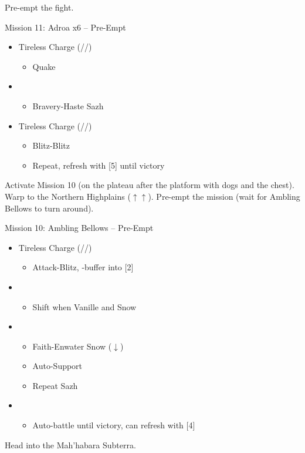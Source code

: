 \renewcommand{\third}{[3] Hero's Charge (\syn/\med/\com)}
\renewcommand{\fourth}{[4] Tireless Charge (\com/\med/\com)}

Pre-empt the fight.

\begin{battle}{Mission 11: Adroa x6 -- Pre-Empt}
	\begin{itemize}
		\item \fourth
			\begin{itemize}
				\item Quake
			\end{itemize}
		\item \first
			\begin{itemize}
				\item Bravery-Haste Sazh
			\end{itemize}
		\item \fourth
			\begin{itemize}
				\item Blitz-Blitz
				\item Repeat, refresh with [5] until victory
			\end{itemize}
	\end{itemize}
\end{battle}

Activate Mission 10 (on the plateau after the platform with dogs and the chest).
Warp to the Northern Highplains ($\uparrow\uparrow$).
Pre-empt the mission (wait for Ambling Bellows to turn around).

\begin{battle}{Mission 10: Ambling Bellows -- Pre-Empt}
	\begin{itemize}
		\item \fourth
			\begin{itemize}
				\item Attack-Blitz, \rav-buffer into [2]
			\end{itemize}
		\item \second
			\begin{itemize}
				\item Shift when Vanille and Snow \stagger
			\end{itemize}
		\item \first
			\begin{itemize}
				\item Faith-Enwater Snow ($\downarrow$)
				\item Auto-Support
				\item Repeat Sazh
			\end{itemize}
		\item \fifth
			\begin{itemize}
				\item Auto-battle until victory, can refresh with [4]
			\end{itemize}
	\end{itemize}
\end{battle}

Head into the Mah'habara Subterra.
\vfill